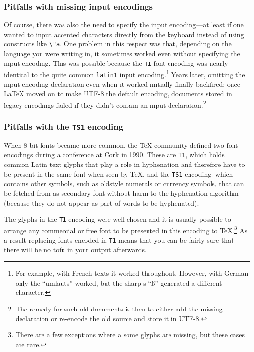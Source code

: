 \documentclass{ltugboat}
\begin{document}
\subsubsection{Pitfalls with missing input encodings}

Of course, there was also the need to specify the input encoding---at
least if one wanted to input accented characters directly from the
keyboard instead of using constructs like \verb=\"a=. One problem in
this respect was that, depending on the language you were writing in,
it sometimes worked even without specifying the input encoding. This
was possible because the \texttt{T1} font encoding was nearly identical to
the quite common \texttt{latin1} input encoding.\footnote{For example,
  with French texts it worked throughout. However, with German only
  the ``umlauts'' worked, but the sharp s ``ß'' generated a different
  character.}  Years later, omitting the input encoding declaration
even when it worked initially finally backfired: once \LaTeX{} moved
on to make UTF-8 the default encoding, documents stored in legacy
encodings failed if they didn't contain an input
declaration.\footnote{The remedy for such old documents is then to
  either add the missing declaration or re-encode the old source and
  store it in UTF-8.}

\subsubsection{Pitfalls with the \texttt{TS1} encoding}

When 8-bit fonts became more common, the \TeX{} community defined two
font encodings during a conference at Cork in 1990. These are
\texttt{T1}, which holds common Latin text glyphs that play a role in
hyphenation and therefore have to be present in the same font when
seen by \TeX{}, and the \texttt{TS1} encoding, which contains other
symbols, such as oldstyle numerals or currency symbols, that can be
fetched from as secondary font without harm to the hyphenation
algorithm (because they do not appear as part of words to be
hyphenated).

The glyphs in the \texttt{T1} encoding were well chosen and it is usually
possible to arrange any commercial or free font to be presented in
this encoding to \TeX.\footnote{There are a few exceptions where a some
  glyphs are missing, but these cases are rare.} As a result replacing
fonts encoded in \texttt{T1} means that you can be fairly sure that
there will be no tofu in your output afterwards.
\end{document}
